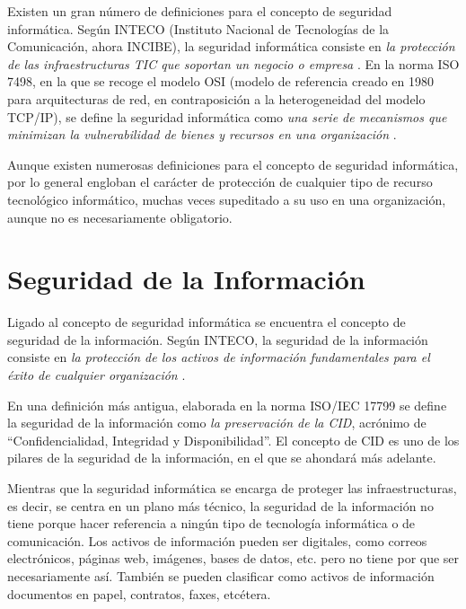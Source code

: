 Existen un gran número de definiciones para el concepto de seguridad informática. Según INTECO (Instituto Nacional de Tecnologías de la Comunicación, ahora INCIBE), la seguridad informática consiste en \textit{la protección de las infraestructuras TIC que soportan un negocio o empresa} \cite{inteco-defs}. En la norma ISO 7498, en la que se recoge el modelo OSI (modelo de referencia creado en 1980 para arquitecturas de red, en contraposición a la heterogeneidad del modelo TCP/IP), se define la seguridad informática como \textit{una serie de mecanismos que minimizan la vulnerabilidad de bienes y recursos en una organización} \cite{iso-7498}.

Aunque existen numerosas definiciones para el concepto de seguridad informática, por lo general engloban el carácter de protección de cualquier tipo de recurso tecnológico informático, muchas veces supeditado a su uso en una organización, aunque no es necesariamente obligatorio.


\section{Seguridad de la Información}

Ligado al concepto de seguridad informática se encuentra el concepto de seguridad de la información. Según INTECO, la seguridad de la información consiste en \textit{la protección de los activos de información fundamentales para el éxito de cualquier organización} \cite{inteco-defs}.

En una definición más antigua, elaborada en la norma ISO/IEC 17799 \cite{iso-17799} se define la seguridad de la información como \textit{la preservación de la CID}, acrónimo de “Confidencialidad, Integridad y Disponibilidad”. El concepto de CID es uno de los pilares de la seguridad de la información, en el que se ahondará más adelante.

Mientras que la seguridad informática se encarga de proteger las infraestructuras, es decir, se centra en un plano más técnico, la seguridad de la información no tiene porque hacer referencia a ningún tipo de tecnología informática o de comunicación. Los activos de información pueden ser digitales, como correos electrónicos, páginas web, imágenes, bases de datos, etc. pero no  tiene por que ser necesariamente así. También se pueden clasificar como activos de información documentos en papel, contratos, faxes, etcétera.

